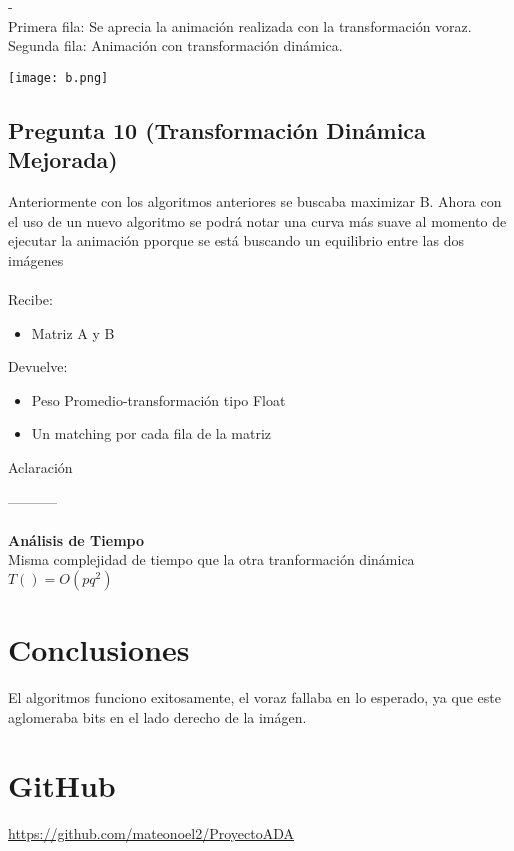 \documentclass{article}
\newcommand{\TITLE}[1]{\item[#1]}
\begin{document}
-\\Primera fila: Se aprecia la animación realizada con la transformación voraz.\\ Segunda fila: Animación con transformación dinámica.
		\begin{center}
			\texttt{[image: b.png]}
		\end{center}
		
		\subsection*{Pregunta 10 (Transformación Dinámica Mejorada)}
		Anteriormente con los algoritmos anteriores se buscaba maximizar B. Ahora con el uso de un nuevo algoritmo se podrá notar una curva más suave al momento de ejecutar la animación pporque se está buscando un equilibrio entre las dos imágenes\\\\
		Recibe:
		\begin{itemize}
			\item Matriz A y B
		\end{itemize}
		Devuelve: 
		\begin{itemize}
			\item Peso Promedio-transformación tipo Float
			\item Un matching por cada fila de la matriz
		\end{itemize}
		Aclaración
		\\
		\begin{algorithmic}
			\TITLE{\textsc{Transformación-Dinámica-Promedio}$(A, B)$}
		\end{algorithmic}
		-----------\\\\
		\textbf{Análisis de Tiempo}\\
		Misma complejidad de tiempo que la otra tranformación dinámica $T()=O(pq^2)$
		\section{Conclusiones}
		El algoritmos funciono exitosamente, el voraz fallaba en lo esperado, ya que este aglomeraba bits en el lado derecho de la imágen.
\section{GitHub}
\href{https://github.com/mateonoel2/ProyectoADA}{https://github.com/mateonoel2/ProyectoADA}
\end{document}
